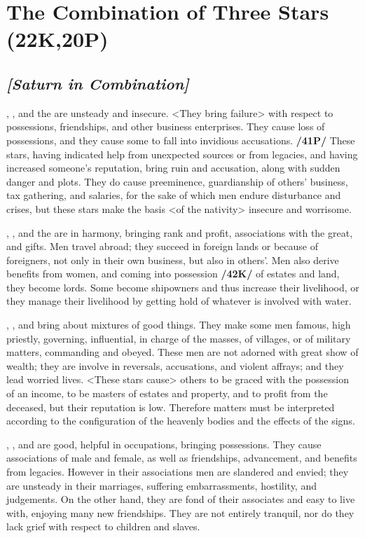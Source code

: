 \section{The Combination of Three Stars (22K,20P)}
\subsection{\textit{[Saturn in Combination]}}
\Saturn, \Jupiter, and the \Sun\xspace are unsteady and insecure. <They bring failure> with respect to possessions, friendships, and other business enterprises. They cause loss of possessions, and they cause some to fall into invidious accusations. \textbf{/41P/} These stars, having indicated help from unexpected sources or from legacies, and having increased someone’s reputation, bring ruin and accusation, along with sudden danger and plots. They do cause preeminence, guardianship of others’ business, tax gathering, and salaries, for the sake of which men endure disturbance and crises, but these stars make the basis <of the nativity> insecure and worrisome.

\Saturn, \Jupiter, and the \Moon\xspace are in harmony, bringing rank and profit, associations with the great, and gifts. Men travel abroad; they succeed in foreign lands or because of foreigners, not only in their own business, but also in others’. Men also derive benefits from women, and coming into possession \textbf{/42K/} of estates and land, they become lords. Some become shipowners and thus increase their livelihood, or they manage their livelihood by getting hold of whatever is involved with water.

\Saturn, \Jupiter, and \Mars\xspace bring about mixtures of good things. They make some men famous, high priestly,
governing, influential, in charge of the masses, of villages, or of military matters, commanding and obeyed. These men are not adorned with great show of wealth; they are involve in reversals, accusations, and violent affrays; and they lead worried lives. <These stars cause> others to be graced with the possession of an income, to be masters of estates and property, and to profit from the deceased, but their reputation is low. \mndl Therefore matters must be interpreted according to the configuration of the heavenly bodies and the effects of the signs.

\Saturn, \Jupiter, and \Venus\xspace are good, helpful in occupations, bringing possessions. They cause associations of male and female, as well as friendships, advancement, and benefits from legacies. However in their associations men are slandered and envied; they are unsteady in their marriages, suffering embarrassments, hostility, and judgements. On the other hand, they are fond of their associates and easy to
live with, enjoying many new friendships. They are not entirely tranquil, nor do they lack grief with respect to children and slaves.

